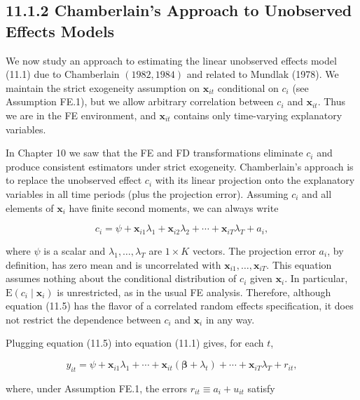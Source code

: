 \documentclass[10pt]{article}
\begin{document}
\subsection*{11.1.2 Chamberlain's Approach to Unobserved Effects Models}
We now study an approach to estimating the linear unobserved effects model (11.1) due to Chamberlain $(1982,1984)$ and related to Mundlak (1978). We maintain the strict exogeneity assumption on $\mathbf{x}_{i t}$ conditional on $c_{i}$ (see Assumption FE.1), but we allow arbitrary correlation between $c_{i}$ and $\mathbf{x}_{i t}$. Thus we are in the FE environment, and $\mathbf{x}_{i t}$ contains only time-varying explanatory variables.

In Chapter 10 we saw that the FE and FD transformations eliminate $c_{i}$ and produce consistent estimators under strict exogeneity. Chamberlain's approach is to replace the unobserved effect $c_{i}$ with its linear projection onto the explanatory variables in all time periods (plus the projection error). Assuming $c_{i}$ and all elements of $\mathbf{x}_{i}$ have finite second moments, we can always write


\begin{equation*}
c_{i}=\psi+\mathbf{x}_{i 1} \lambda_{1}+\mathbf{x}_{i 2} \lambda_{2}+\cdots+\mathbf{x}_{i T} \lambda_{T}+a_{i}, \tag{11.5}
\end{equation*}


where $\psi$ is a scalar and $\lambda_{1}, \ldots, \lambda_{T}$ are $1 \times K$ vectors. The projection error $a_{i}$, by definition, has zero mean and is uncorrelated with $\mathbf{x}_{i 1}, \ldots, \mathbf{x}_{i T}$. This equation assumes nothing about the conditional distribution of $c_{i}$ given $\mathbf{x}_{i}$. In particular, $\mathrm{E}\left(c_{i} \mid \mathbf{x}_{i}\right)$ is unrestricted, as in the usual FE analysis. Therefore, although equation (11.5) has the flavor of a correlated random effects specification, it does not restrict the dependence between $c_{i}$ and $\mathbf{x}_{i}$ in any way.

Plugging equation (11.5) into equation (11.1) gives, for each $t$,


\begin{equation*}
y_{i t}=\psi+\mathbf{x}_{i 1} \lambda_{1}+\cdots+\mathbf{x}_{i t}\left(\boldsymbol{\beta}+\lambda_{t}\right)+\cdots+\mathbf{x}_{i T} \lambda_{T}+r_{i t}, \tag{11.6}
\end{equation*}


where, under Assumption FE.1, the errors $r_{i t} \equiv a_{i}+u_{i t}$ satisfy
\end{document}
